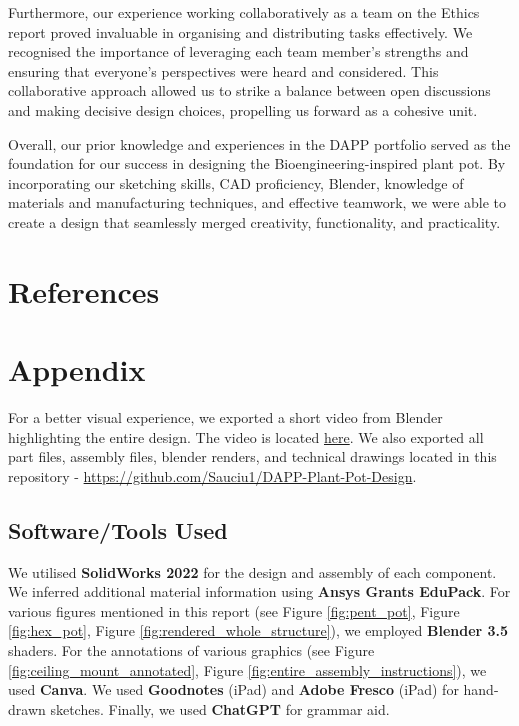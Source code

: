 \documentclass[12pt]{extarticle} %
\begin{document}
Furthermore, our experience working collaboratively as a team on the Ethics report proved invaluable in organising and distributing tasks effectively. We recognised the importance of leveraging each team member's strengths and ensuring that everyone's perspectives were heard and considered. This collaborative approach allowed us to strike a balance between open discussions and making decisive design choices, propelling us forward as a cohesive unit. 
 
Overall, our prior knowledge and experiences in the DAPP portfolio served as the foundation for our success in designing the Bioengineering-inspired plant pot. By incorporating our sketching skills, CAD proficiency, Blender, knowledge of materials and manufacturing techniques, and effective teamwork, we were able to create a design that seamlessly merged creativity, functionality, and practicality. 
\section{References}
\printbibliography[heading=none]
\pagebreak
\section{Appendix}
For a better visual experience, we exported a short video from Blender highlighting the entire design. The video is located \href{https://drive.google.com/file/d/1XJ0yTDizML6BhURdkV9e93mYVJ_03wjc/view?usp=sharing}{here}.
We also exported all part files, assembly files, blender renders, and technical drawings located in this repository - \href{https://github.com/Sauciu1/DAPP-Plant-Pot-Design}{https://github.com/Sauciu1/DAPP-Plant-Pot-Design}. 

\subsection{Software/Tools Used}
We utilised \textbf{SolidWorks 2022} for the design and assembly of each component. We inferred additional material information using  \textbf{Ansys Grants EduPack}. For various figures mentioned in this report (see Figure \ref{fig:pent_pot}, Figure \ref{fig:hex_pot}, Figure \ref{fig:rendered_whole_structure}), we employed \textbf{Blender 3.5} shaders. For the annotations of various graphics (see Figure \ref{fig:ceiling_mount_annotated}, Figure \ref{fig:entire_assembly_instructions}), we used \textbf{Canva}. We used \textbf{Goodnotes} (iPad) and \textbf{Adobe Fresco} (iPad) for hand-drawn sketches. Finally, we used \textbf{ChatGPT} for grammar aid.
\end{document}

